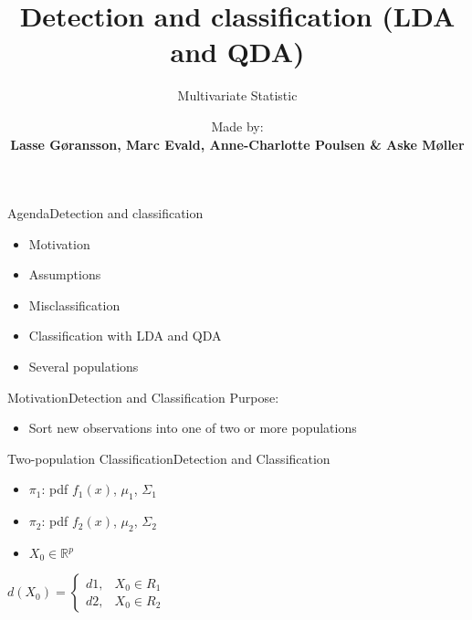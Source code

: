 \documentclass[aspectratio=169,10pt,t]{beamer}
\title{Detection and classification (LDA and QDA)}
\subtitle{Multivariate Statistic}
\date{ }
\author{
	Made by: \\
	\textbf{Lasse Gøransson, Marc Evald, Anne-Charlotte Poulsen \& Aske Møller}
}
\institute[
  SDU Robotics\\
  The Maersk Mc-Kinney Moller Institute\\
  University of Southern Denmark
] %
{%
  SDU Robotics\\
  The Maersk Mc-Kinney Moller Institute\\
  University of Southern Denmark

}
\begin{document}
{\SDUwavesbg%
\begin{frame} %
  \titlepage
\end{frame}}

\begin{frame}{Agenda}{Detection and classification}{\vphantom{(y}}
\begin{itemize}
    \item Motivation
		\item Assumptions 
		\item Misclassification
		\item Classification with LDA and QDA
		\item Several populations
\end{itemize}
\end{frame}

\setcounter{page}{1}
\begin{frame}{Motivation}{Detection and Classification}
    Purpose: 
    \begin{itemize}
        \item Sort new observations into one of two or more populations
    \end{itemize}
\end{frame}

\begin{frame}{Two-population Classification}{Detection and Classification}
    \begin{itemize}
        \item $\pi_1$: pdf $f_1(x)$, $\mu_1$, $\Sigma_1$
        \item $\pi_2$: pdf $f_2(x)$, $\mu_2$, $\Sigma_2$
				\item $X_0 \in \mathbb{R}^p$ \\
    \end{itemize}

		\vspace{2cm}

    \quad $d(X_0) = \begin{cases} d1, &X_0 \in R_1 \\ d2, &X_0 \in R_2 \end{cases}$ \\
\end{frame}
\end{document}
